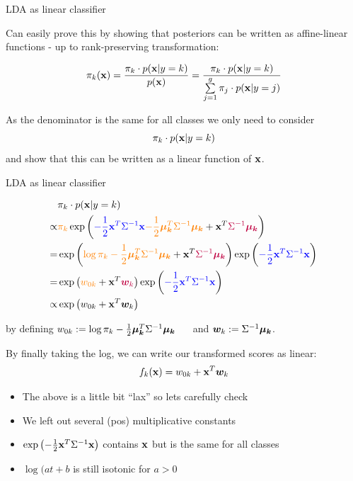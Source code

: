 \documentclass[11pt,compress,t,notes=noshow, xcolor=table]{beamer}
\begin{document}
\begin{vbframe}{LDA as linear classifier}

Can easily prove this by showing that posteriors can be written as affine-linear functions - up to rank-preserving transformation:

$$
  \pikx = \frac{\pik \cdot \pdfxyk }{\pdfx} = \frac{\pik \cdot \pdfxyk}{\sumjg \pi_j \cdot \pdfxyk[j]}
$$

As the denominator is the same for all classes we only need to consider 
$$\pik \cdot \pdfxyk$$ 
and show that this can be written as a linear function of $\xv$.

\end{vbframe}

\begin{vbframe}{LDA as linear classifier}
\begin{footnotesize}
\begin{eqnarray*}
& \pik \cdot \pdfxyk \\
\propto& \textcolor{orange}{\pik} \exp\left(\textcolor{blue}{- \frac{1}{2} \xv^T\Sigma^{-1}\xv} \textcolor{orange}{- \frac{1}{2} \muk^T \Sigma^{-1} \muk} + \xv^T \textcolor{purple}{\Sigma^{-1} \muk} \right) \\
=& \exp\left(\textcolor{orange}{\log \pik - \frac{1}{2} \muk^T \Sigma^{-1} \muk} + \xv^T \textcolor{purple}{\Sigma^{-1} \muk} \right) \exp\left(\textcolor{blue}{- \frac{1}{2} \xv^T\Sigma^{-1}\xv}\right) \\
=& \exp\left(\textcolor{orange}{w_{0k}} + \xv^T \textcolor{purple}{\bm{w}_k}\right) \exp\left(\textcolor{blue}{- \frac{1}{2} \xv^T\Sigma^{-1}\xv}\right)\\
\propto& \exp\left(w_{0k} + \xv^T \bm{w}_k\right) 
\end{eqnarray*}

by defining
$w_{0k} := \log \pik  - \frac{1}{2} \muk^T \Sigma^{-1} \muk$ $\quad$ and $\bm{w}_k := \Sigma^{-1} \muk$.

\lz

By finally taking the log, we can write our transformed scores as linear:  
$$ \fkx =  w_{0k} + \xv^T \bm{w}_k $$


\begin{itemize}
\item The above is a little bit \enquote{lax} so lets carefully check
\item We left out several (pos) multiplicative constants
\item $\exp\left(- \frac{1}{2} \xv^T\Sigma^{-1}\xv\right)$ contains $\xv$ but is the same for all classes
\item $\log(a t + b $ is still isotonic for $a > 0$
\end{itemize}
\end{footnotesize}



\end{vbframe}
\end{document}
